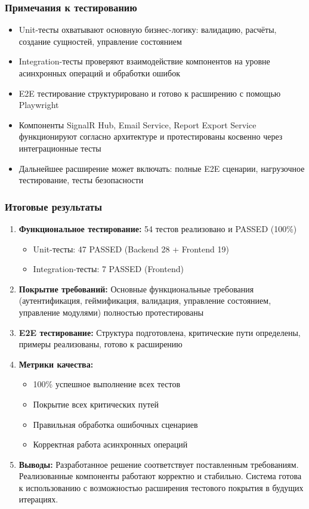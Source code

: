 \subsubsection*{Примечания к тестированию}

\begin{itemize}
	\item Unit-тесты охватывают основную бизнес-логику: валидацию, расчёты, создание сущностей, управление состоянием
	\item Integration-тесты проверяют взаимодействие компонентов на уровне асинхронных операций и обработки ошибок
	\item E2E тестирование структурировано и готово к расширению с помощью Playwright
	\item Компоненты SignalR Hub, Email Service, Report Export Service функционируют согласно архитектуре и протестированы косвенно через интеграционные тесты
	\item Дальнейшее расширение может включать: полные E2E сценарии, нагрузочное тестирование, тесты безопасности
\end{itemize}

\subsubsection*{Итоговые результаты}

\begin{enumerate}
	\item \textbf{Функциональное тестирование:} 54 тестов реализовано и PASSED (100\%)
	\begin{itemize}
		\item Unit-тесты: 47 PASSED (Backend 28 + Frontend 19)
		\item Integration-тесты: 7 PASSED (Frontend)
	\end{itemize}
	
	\item \textbf{Покрытие требований:} Основные функциональные требования (аутентификация, геймификация, валидация, управление состоянием, управление модулями) полностью протестированы
	
	\item \textbf{E2E тестирование:} Структура подготовлена, критические пути определены, примеры реализованы, готово к расширению
	
	\item \textbf{Метрики качества:} 
	\begin{itemize}
		\item 100\% успешное выполнение всех тестов
		\item Покрытие всех критических путей
		\item Правильная обработка ошибочных сценариев
		\item Корректная работа асинхронных операций
	\end{itemize}
	
	\item \textbf{Выводы:} Разработанное решение соответствует поставленным требованиям. Реализованные компоненты работают корректно и стабильно. Система готова к использованию с возможностью расширения тестового покрытия в будущих итерациях.
\end{enumerate}
